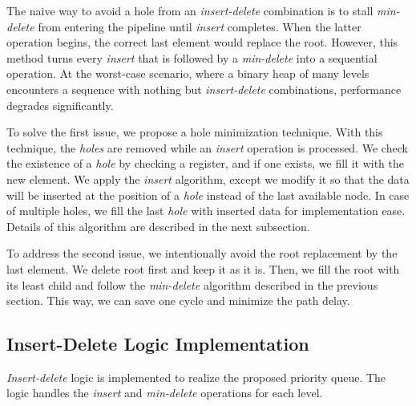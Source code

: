 \documentclass[10pt, conference, compsocconf]{IEEEtran}
\begin{document}
The naive way to avoid a hole from an {\it insert-delete} combination is to stall {\it min-delete} from entering the pipeline until {\it insert} completes. 
When the latter operation begins, the correct last element would replace the root. 
However, this method turns every {\it insert} that is followed by a {\it min-delete} into a sequential operation. 
At the worst-case scenario, where a binary heap of many levels encounters a sequence with nothing but {\it insert-delete} combinations, performance degrades significantly.

To solve the first issue, we propose a hole minimization technique.
With this technique, the {\it holes} are removed while an {\it insert} operation is processed.
We check the existence of a {\it hole} by checking a register, and if one exists, we fill it with the new element. 
We apply the {\it insert} algorithm, except we modify it so that the data will be inserted at the position of a {\it hole} instead of the last available node. 
In case of multiple holes, we fill the last {\it hole} with inserted data for implementation ease.
Details of this algorithm are described in the next subsection.

To address the second issue, we intentionally avoid the root replacement by the last element.
We delete root first and keep it as it is. 
Then, we fill the root with its least child and follow the {\it min-delete} algorithm described in the previous section.
This way, we can save one cycle and minimize the path delay.

\subsection{Insert-Delete Logic Implementation}

{\it Insert-delete} logic is implemented to realize the proposed priority queue.
The logic handles the {\it insert} and {\it min-delete} operations for each level.
\end{document}
